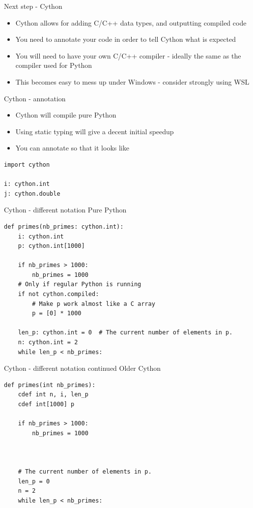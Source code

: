 \documentclass[presentation]{beamer}
\begin{document}
\begin{frame}[label=next-step---cython]{Next step - Cython}
\begin{itemize}
\item Cython allows for adding C/C++ data types, and outputting compiled
code
\item You need to annotate your code in order to tell Cython what is
expected
\item You will need to have your own C/C++ compiler - ideally the same as
the compiler used for Python
\item This becomes easy to mess up under Windows - consider strongly using
WSL
\end{itemize}
\end{frame}
\begin{frame}[label=cython---annotation,fragile]{Cython - annotation}
 \begin{itemize}
\item Cython will compile pure Python
\item Using static typing will give a decent initial speedup
\item You can annotate so that it looks like
\end{itemize}

\begin{verbatim}
import cython

i: cython.int
j: cython.double
\end{verbatim}
\end{frame}
\begin{frame}[label=cython---different-notation,fragile]{Cython - different notation}
 Pure Python

\begin{verbatim}
def primes(nb_primes: cython.int):
    i: cython.int
    p: cython.int[1000]

    if nb_primes > 1000:
        nb_primes = 1000
    # Only if regular Python is running
    if not cython.compiled:
        # Make p work almost like a C array
        p = [0] * 1000

    len_p: cython.int = 0  # The current number of elements in p.
    n: cython.int = 2
    while len_p < nb_primes:
\end{verbatim}
\end{frame}
\begin{frame}[label={sec:org1a531ac},fragile]{Cython - different notation continued}
 Older Cython

\begin{verbatim}
def primes(int nb_primes):
    cdef int n, i, len_p
    cdef int[1000] p

    if nb_primes > 1000:
        nb_primes = 1000



    # The current number of elements in p.
    len_p = 0
    n = 2
    while len_p < nb_primes:
\end{verbatim}
\end{frame}
\end{document}
